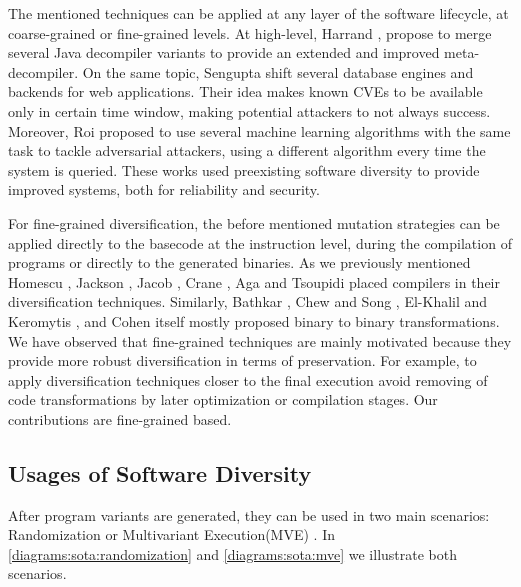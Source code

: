 The mentioned techniques can be applied at any layer of the software lifecycle, at coarse-grained or fine-grained levels.
At high-level, Harrand \etal  \cite{harrand2020java}, propose to merge several Java decompiler variants to provide an extended and improved meta-decompiler. On the same topic, Sengupta \etal \cite{10.5555/3091125.3091155} shift several database engines and backends for web applications. Their idea makes known CVEs to be available only in certain time window, making potential attackers to not always success. Moreover, Roi \etal \cite{10.1145/3318216.3363338} proposed to use several machine learning algorithms with the same task to tackle adversarial attackers, using a different algorithm every time the system is queried.
These works used preexisting software diversity to provide improved systems, both for reliability and security.

For fine-grained diversification, the before mentioned mutation strategies can be applied directly to the basecode at the instruction level, during the compilation of programs or directly to the generated binaries. As we previously mentioned Homescu \etal \cite{homescu2013profile}, Jackson \etal \cite{jackson, jackson2011compiler}, Jacob \etal \cite{jacob2008superdiversifier}, Crane \etal \cite{crane2015thwarting}, Aga \etal \cite{aga2019smokestack} and Tsoupidi \etal \cite{Tsoupidi2020ConstraintBasedSD} placed compilers in their diversification techniques. Similarly, Bathkar \etal \cite{bhatkar03,bhatkar2005efficient}, Chew and Song \cite{Chew02mitigatingbuffer}, El-Khalil and Keromytis \cite{ElKhalil2004}, and Cohen \cite{cohen1993operating} itself mostly proposed binary to binary transformations. 
We have observed that fine-grained techniques are mainly motivated because they provide more robust diversification in terms of preservation. For example, to apply diversification techniques closer to the final execution avoid removing of code transformations by later optimization or compilation stages. Our contributions are fine-grained based. 


\subsection*{Usages of Software Diversity}

After program variants are generated, they can be used in two main scenarios: Randomization or Multivariant Execution(MVE) \cite{jackson}. In \autoref{diagrams:sota:randomization} and \autoref{diagrams:sota:mve} we illustrate both scenarios. 



